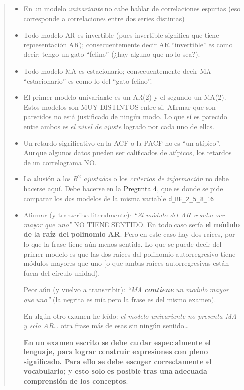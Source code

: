 \documentclass[10pt]{article}
\begin{document}
\begin{quote}
\begin{itemize}
\item En un modelo \emph{univariante} no cabe hablar de correlaciones espurias
(eso corresponde a correlaciones entre dos series distintas)

\item Todo modelo AR es invertible (pues invertible significa que tiene
representación AR); consecuentemente decir AR ``invertible'' es como
decir: tengo un gato ``felino'' (¿hay alguno que no lo sea?).

\item Todo modelo MA es estacionario; consecuentemente decir MA
``estacionario'' es como lo del ``gato felino''.

\item El primer modelo univariante es un AR(2) y el segundo un
MA(2). Estos modelos son MUY DISTINTOS entre si. Afirmar que son
parecidos no está justificado de ningún modo. Lo que sí es parecido
entre ambos es \emph{el nivel de ajuste} logrado por cada uno de ellos.

\item Un retardo significativo en la ACF o la PACF no es ``un
atípico''. Aunque algunos datos pueden ser calificados de atípicos,
los retardos de un correlograma NO.

\item La alusión a los \(R^2\) \emph{ajustados} o los \emph{criterios de información}
no debe hacerse aquí. Debe hacerse en la \hyperref[sec:orgcb53583]{Pregunta 4}, que es donde se
pide comparar los dos modelos de la misma variable \texttt{d\_BE\_2\_5\_8\_16}

\item Afirmar (y transcribo literalmente): \emph{``El módulo del AR resulta ser
mayor que uno''} NO TIENE SENTIDO. En todo caso sería \textbf{el módulo de
la raíz del polinomio AR}. Pero en este caso hay dos raíces, por lo
que la frase tiene aún menos sentido. Lo que se puede decir del
primer modelo es que las dos raíces del polinomio autorregresivo
tiene módulos mayores que uno (o que ambas raíces autorregresivas
están fuera del círculo unidad).

Peor aún (y vuelvo a transcribir): \emph{``MA \textbf{contiene} un modulo mayor
que uno''} (la negrita es mía pero la frase es del mismo examen).

En algún otro examen he leído: \emph{el modelo univariante no presenta MA
y solo AR}\ldots{} otra frase más de esas sin ningún sentido\ldots{}

\textbf{En un examen escrito se debe cuidar especialmente el lenguaje, para
lograr construir expresiones con pleno significado. Para ello se
debe escoger correctamente el vocabulario; y esto solo es posible
tras una adecuada comprensión de los conceptos}.
\end{itemize}
\end{quote}
\end{document}
